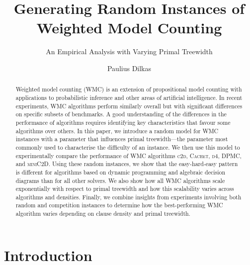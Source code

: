 \documentclass[runningheads]{llncs}
\begin{document}
\title{Generating Random Instances of Weighted Model Counting}
\subtitle{An Empirical Analysis with Varying Primal Treewidth}

\author{Paulius Dilkas}


\maketitle

\begin{abstract}
  Weighted model counting (\textsf{WMC}) is an extension of propositional model
  counting with applications to probabilistic inference and other areas of
  artificial intelligence. In recent experiments, \textsf{WMC} algorithms
  perform similarly overall but with significant differences on specific subsets
  of benchmarks. A good understanding of the differences in the performance of
  algorithms requires identifying key characteristics that favour some
  algorithms over others. In this paper, we introduce a random model for
  \textsf{WMC} instances with a parameter that influences primal treewidth---the
  parameter most commonly used to characterise the difficulty of an instance. We
  then use this model to experimentally compare the performance of \textsf{WMC}
  algorithms \textsc{c2d}, \textsc{Cachet}, \textsc{d4}, \textsc{DPMC}, and
  \textsc{miniC2D}. Using these random instances, we show that the
  easy-hard-easy pattern is different for algorithms based on dynamic
  programming and algebraic decision diagrams than for all other solvers. We
  also show how all \textsf{WMC} algorithms scale exponentially with respect to
  primal treewidth and how this scalability varies across algorithms and
  densities. Finally, we combine insights from experiments involving both random
  and competition instances to determine how the best-performing \textsf{WMC}
  algorithm varies depending on clause density and primal treewidth.

\end{abstract}


\section{Introduction}
\end{document}
